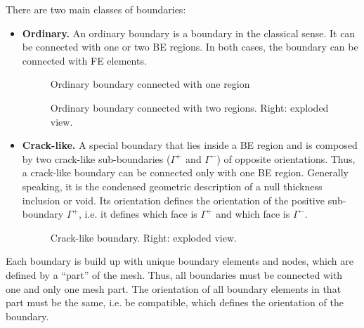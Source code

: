 \documentclass[a4paper,fleqn]{book}
\begin{document}
There are two main classes of boundaries:
\begin{itemize}
  \item \textbf{Ordinary.} An ordinary boundary is a boundary in the classical sense. It can be connected with one or two BE regions. In both cases, the boundary can be connected with FE elements.

  \begin{minipage}[b]{\linewidth}
    \centering
    \begin{minipage}[t]{0.28\linewidth}
      \begin{figure}[H]
      \centering
      
      \caption{Ordinary boundary connected with one region}
      \end{figure}
    \end{minipage}
    \begin{minipage}[t]{0.71\linewidth}
      \begin{figure}[H]
      \centering
      
      \caption{Ordinary boundary connected with two regions. Right: exploded view.}
      \label{fig:ordinary_boundary_interface}
      \end{figure}
    \end{minipage}
  \end{minipage}

  \item \textbf{Crack-like.} A special boundary that lies inside a BE region and is composed by two crack-like sub-boundaries ($\Gamma^+$ and $\Gamma^-$) of opposite orientations. Thus, a crack-like boundary can be connected only with one BE region. Generally speaking, it is the condensed geometric description of a null thickness inclusion or void. Its orientation defines the orientation of the positive sub-boundary $\Gamma^+$, i.e. it defines which face is $\Gamma^+$ and which face is $\Gamma^-$.
  
  \begin{minipage}[b]{\linewidth}
    \centering
    \begin{figure}[H]
      \centering
      
      \caption{Crack-like boundary. Right: exploded view.}
    \end{figure}
  \end{minipage}
\end{itemize}

Each boundary is build up with unique boundary elements and nodes, which are defined by a ``part'' of the mesh. Thus, all boundaries must be connected with one and only one mesh part. The orientation of all boundary elements in that part must be the same, i.e. be compatible, which defines the orientation of the boundary.
\end{document}
